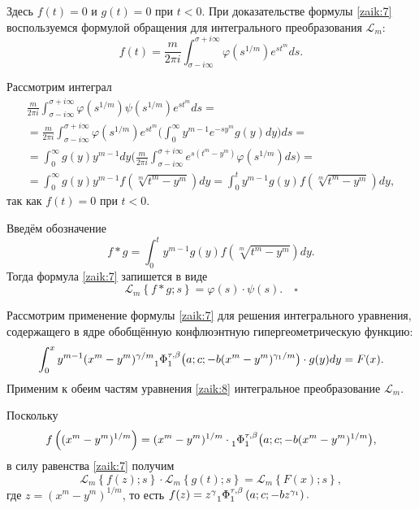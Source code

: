 \begin{mproof}
Здесь $f(t)=0$ и $g(t)=0$ при $t<0$.
При доказательстве формулы \eqref{zaik:7} воспользуемся формулой обращения для интегрального преобразования $\mathcal L_m$:
$$
f(t)=\frac{m}{2\pi i}\int_{\sigma-i\infty}^{\sigma+i\infty}\varphi(s^{{1}/{m}})e^{st^m}ds.
$$

Рассмотрим интеграл
\begin{multline*}
\frac{m}{2\pi i}\int_{\sigma-i\infty}^{\sigma+i\infty}
\varphi(s^{{1}/{m}})\psi(s^{{1}/{m}})e^{st^m}ds=
\\
=\frac{m}{2\pi i}\int_{\sigma-i\infty}^{\sigma+i\infty}
\varphi(s^{{1}/{m}})e^{st^m} \biggl(
\int_{0}^{\infty}y^{m-1}e^{-sy^m}g(y)dy\biggr)ds=
\\
=\int_{0}^{\infty}g(y)y^{m-1}dy
\biggl(
\frac{m}{2\pi i}\int_{\sigma-i\infty}^{\sigma+i\infty}e^{s(t^m-y^m)}\varphi
(s^{{1}/{m}})ds\biggr)=
\\
=\int_{0}^{\infty}g(y)y^{m-1}f\left(\sqrt[m]{t^m-y^m}\right)dy= \int_{0}^{t}y^{m-1}g(y)f\left(\sqrt[m]{t^m-y^m}\right)dy,
\end{multline*}
так как $f(t)=0$ при $t<0$.



Введём обозначение
$$f\ast g=\int_0^t y^{m-1}g(y)f\left(\sqrt[m]{t^m-y^m}\right)dy.$$
Тогда формула \eqref{zaik:7} запишется в виде
$$
\mathcal L_m\left\{f\ast g;s\right\}=\varphi(s)\cdot\psi(s). \quad \square
$$

\end{mproof}

\smallskip

Рассмотрим применение формулы \eqref{zaik:7} для решения интегрального уравнения, содержащего в ядре обобщённую конфлюэнтную гипергеометрическую функцию:
\begin{equation}
\label{zaik:8} 
\int_0^{x} y^{m-1}(x^m-y^m)^{{\gamma}/{m}}{\mathstrut}_1\Phi{\mathstrut}_1^{\tau,\beta}
\bigl(a;c;-b(x^m-y^m)^{{\gamma_1}/{m}}\bigr)\cdot g(y)dy=F(x).
 \end{equation} 
Применим к обеим частям уравнения \eqref{zaik:8} интегральное преобразование $\mathcal L_m$.
 
Поскольку
$$
f\left((x^m-y^m)^{{1}/{m}}\right)=
(x^m-y^m)^{{1}/{m}}\cdot {\mathstrut}_1\Phi{\mathstrut}_1^{\tau,\beta}
\bigl(a;c;-b(x^m-y^m)^{{1}/{m}}\bigr),
$$
в силу равенства \eqref{zaik:7}  получим
\begin{equation}
\label{zaik:9} 
\mathcal L_m\left\{f(z);s\right\}\cdot\mathcal L_m\left\{g(t);s\right\}=\mathcal L_m\left\{F(x);s\right\} ,
 \end{equation}
где $z=(x^m-y^m)^{{1}/{m}}$, то есть  $f(z)=z^{\gamma} {\mathstrut}_1\Phi{\mathstrut}_1^{\tau,\beta}\left(a;c;-bz^{\gamma_1}\right).$

